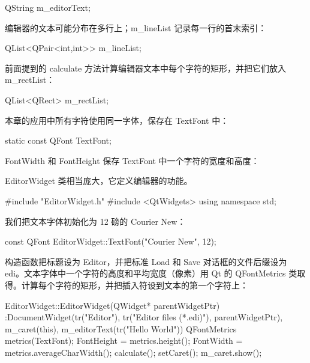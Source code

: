 \begin{codebox}
    QString m_editorText;
\end{codebox}

编辑器的文本可能分布在多行上；m\_lineList 记录每一行的首末索引：

\begin{codebox}
    QList<QPair<int,int>> m_lineList;
\end{codebox}

前面提到的 calculate 方法计算编辑器文本中每个字符的矩形，并把它们放入 m\_rectList：

\begin{codebox}
    QList<QRect> m_rectList;
\end{codebox}

本章的应用中所有字符使用同一字体，保存在 TextFont 中：

\begin{codebox}
    static const QFont TextFont;
\end{codebox}

FontWidth 和 FontHeight 保存 TextFont 中一个字符的宽度和高度：

\begin{codebox}
    int FontWidth, FontHeight;
  };

#endif // EDITORWIDGET_H
\end{codebox}

EditorWidget 类相当庞大，它定义编辑器的功能。

\medskip{}

\begin{codebox}
#include "EditorWidget.h"
#include <QtWidgets>
using namespace std;
\end{codebox}

我们把文本字体初始化为 12 磅的 Courier New：

\begin{codebox}
const QFont EditorWidget::TextFont("Courier New", 12);
\end{codebox}

构造函数把标题设为 Editor，并把标准 Load 和 Save 对话框的文件后缀设为 edi。文本字体中一个字符的高度和平均宽度（像素）用 Qt 的 QFontMetrics 类取得。计算每个字符的矩形，并把插入符设到文本的第一个字符上：

\begin{codebox}
EditorWidget::EditorWidget(QWidget* parentWidgetPtr)
 :DocumentWidget(tr("Editor"), tr("Editor files (*.edi)"),
                 parentWidgetPtr),
  m_caret(this),
  m_editorText(tr("Hello World")) {
  QFontMetrics metrics(TextFont);
  FontHeight = metrics.height();
  FontWidth = metrics.averageCharWidth();
  calculate();
  setCaret();
  m_caret.show();
}
\end{codebox}

